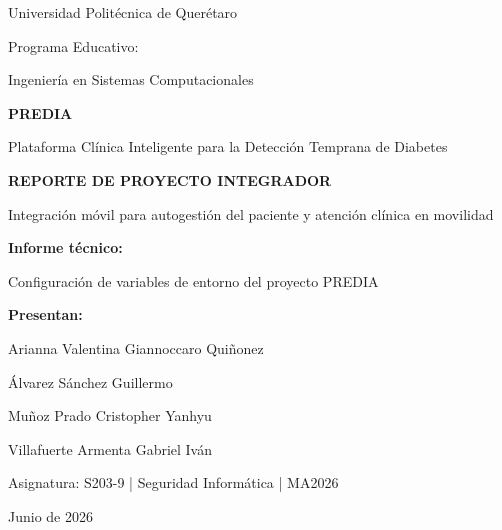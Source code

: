 \documentclass[12pt,a4paper]{article}
\begin{document}
\begin{titlepage}
  \centering
  {\Large Universidad Politécnica de Querétaro\par}
  \vspace{0.35cm}
  {\large Programa Educativo:\par}
  {\large Ingeniería en Sistemas Computacionales\par}
  \vspace{1.2cm}

  {\Huge\bfseries PREDIA\par}
  \vspace{0.25cm}
  {\Large Plataforma Clínica Inteligente para la Detección Temprana de Diabetes\par}
  \vspace{0.9cm}

  {\Large\bfseries REPORTE DE PROYECTO INTEGRADOR\par}
  \vspace{0.35cm}
  {\large Integración móvil para autogestión del paciente y atención clínica en movilidad\par}
  \vspace{1.1cm}

  \begin{tcolorbox}[colback=prediaLight,colframe=prediaBorder,width=0.86\linewidth,arc=2mm,boxrule=0.6pt]
    \centering
    {\large\bfseries Informe técnico:\par}
    \vspace{0.15cm}
    {\large Configuración de variables de entorno del proyecto PREDIA\par}
  \end{tcolorbox}

  \vfill
  {\large\bfseries Presentan:\par}
  \vspace{0.25cm}
  Arianna Valentina Giannoccaro Quiñonez\par
  Álvarez Sánchez Guillermo\par
  Muñoz Prado Cristopher Yanhyu\par
  Villafuerte Armenta Gabriel Iván\par
  \vfill

  {\large Asignatura: S203-9 | Seguridad Informática | MA2026\par}
  \vspace{0.2cm}
  {\large Junio de 2026\par}
\end{titlepage}

\tableofcontents
\newpage
\end{document}
